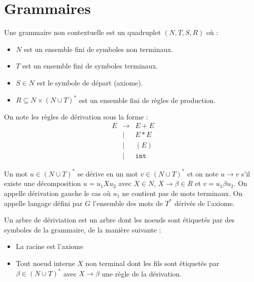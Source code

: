 \documentclass{cours}
\begin{document}
\section{Grammaires}
\begin{definition}
    Une grammaire non contextuelle est un quadruplet $(N, T, S, R)$ où :
    \begin{itemize}
        \item $N$ est un ensemble fini de symboles non terminaux.
        \item $T$ est un ensemble fini de symboles terminaux.
        \item $S \in N$ est le symbole de départ (axiome).
        \item $R \subseteq N \times (N \cup T)^{*}$ est un ensemble fini de règles de production.
    \end{itemize}
\end{definition}
On note les règles de dérivation sous la forme :
\begin{equation*}
    \begin{aligned}
         & E & \rightarrow & E + E        \\
         &   & \mid        & E*E          \\
         &   & \mid        & (E)          \\
         &   & \mid        & \texttt{int}
    \end{aligned}
\end{equation*}

\begin{definition}
    Un mot $u \in (N\cup T)^{*}$ se dérive en un mot $v \in (N \cup T)^{*}$ et on note $u \rightarrow v$ s'il existe une décomposition $u = u_{1}Xu_{2}$ avec $X \in N$, $X \rightarrow \beta \in R$ et $v = u_{1}\beta u_{2}$. On appelle dérivation gauche le cas où $u_{1}$ ne contient pas de mots terminaux.
    On appelle langage défini par $G$ l'ensemble des mots de $T^{*}$ dérivés de l'axiome.
\end{definition}

\begin{definition}
    Un arbre de dériviation est un arbre dont les noeuds sont étiquetés par des symboles de la grammaire, de la manière suivante :
    \begin{itemize}
        \item La racine est l'axiome
        \item Tout noeud interne $X$ non terminal dont les fils sont étiquetés par $\beta \in (N\cup T)^{*}$ avec $X \rightarrow \beta$ une règle de la dérivation.
    \end{itemize}
\end{definition}
\end{document}
